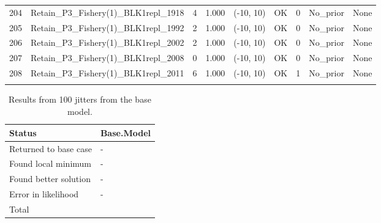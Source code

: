 \documentclass[12pt,]{article}
\begin{document}
\begin{landscape}
\begin{longtable}{rlrrcccll}
  204 & Retain\_P3\_Fishery(1)\_BLK1repl\_1918 & 4 & 1.000 & (-10, 10) & OK & 0 & No\_prior & None \\ 
  205 & Retain\_P3\_Fishery(1)\_BLK1repl\_1992 & 2 & 1.000 & (-10, 10) & OK & 0 & No\_prior & None \\ 
  206 & Retain\_P3\_Fishery(1)\_BLK1repl\_2002 & 2 & 1.000 & (-10, 10) & OK & 0 & No\_prior & None \\ 
  207 & Retain\_P3\_Fishery(1)\_BLK1repl\_2008 & 0 & 1.000 & (-10, 10) & OK & 0 & No\_prior & None \\ 
  208 & Retain\_P3\_Fishery(1)\_BLK1repl\_2011 & 6 & 1.000 & (-10, 10) & OK & 1 & No\_prior & None \\ 
   \hline
\hline
\label{tab:model_params}
\end{longtable}
\end{landscape}

\newpage

\begin{table}[ht]
  \centering
  \caption{Results from 100 jitters from the base model.} 
  \label{tab:jitter}
  \begin{tabular}{>{\centering}p{2in}>{\centering}p{1in}}
    \hline
  Status & Base.Model \\ 
    \hline
  Returned to base case & - \\ 
    Found local minimum & - \\ 
    Found better solution & - \\ 
    Error in likelihood & - \\ 
    Total & 100 \\ 
     \hline
  \end{tabular}
  \end{table}

\FloatBarrier

\newpage
\end{document}
